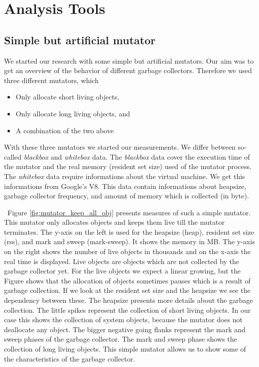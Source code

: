 
\section{Analysis Tools} \label{sec:analysis_tools}

\subsection{Simple but artificial mutator}

We started our research with some simple but artificial mutators. Our aim was to get an overview of the behavior of different \JS garbage collectors. Therefore we used three different mutators, which
\begin{itemize}
	\item Only allocate short living objects,
	\item Only allocate long living objects, and 
	\item A combination of the two above
\end{itemize}
With these three mutators we started our measurements. We differ between so-called \textit{blackbox} and \textit{whitebox} data. The \textit{blackbox} data cover the execution time of the mutator and the real memory (resident set size) used of the mutator process. The \textit{whitebox} data require informations about the \JS virtual machine. We get this informations from Google's V8. This data contain informations about heapsize, garbage collector frequency, and amount of memory which is collected (in byte).

\
Figure \ref{fig:mutator_keep_all_obj} presents measures of such a simple mutator. This mutator only allocates objects and keeps them live till the mutator terminates. The y-axis on the left is used for the heapsize (heap), resident set size (rss), and mark and sweep (mark-sweep). It shows the memory in MB. The y-axis on the right shows the number of live objects in thousands and on the x-axis the real time is displayed. Live objects are objects which are not collected by the garbage collector yet. For the live objects we expect a linear growing, but the Figure shows that the allocation of objects sometimes pauses which is a result of garbage collection. If we look at the resident set size and the heapsize we see the dependency between these. The heapsize presents more details about the garbage collection. The little spikes represent the collection of short living objects. In our case this shows the collection of system objects, because the mutator does not deallocate any object. The bigger negative going flanks represent the mark and sweep phases of the garbage collector. The mark and sweep phase shows the collection of long living objects. This simple mutator allows us to show some of the characteristics of the garbage collector.

